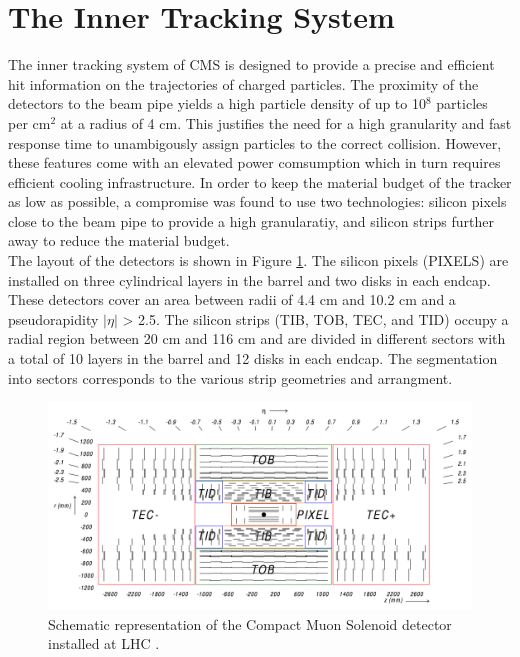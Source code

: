   \section{The Inner Tracking System}

    The inner tracking system of CMS is designed to provide a precise and efficient hit information on the trajectories of charged particles.  The proximity of the detectors to the beam pipe yields a high particle density of up to 10$^8$ particles per cm$^2$ at a radius of 4 cm. This justifies the need for a high granularity and fast response time to unambigously assign particles to the correct collision. However, these features come with an elevated power comsumption which in turn requires efficient cooling infrastructure. In order to keep the material budget of the tracker as low as possible, a compromise was found to use two technologies: silicon pixels close to the beam pipe to provide a high granularatiy, and silicon strips further away to reduce the material budget. \\

    The layout of the detectors is shown in Figure \ref{fig:I-3-tracker}. The silicon pixels (PIXELS) are installed on three cylindrical layers in the barrel and two disks in each endcap. These detectors cover an area between radii of 4.4 cm and 10.2 cm and a pseudorapidity $|\eta|$ > 2.5. The silicon strips (TIB, TOB, TEC, and TID) occupy a radial region between 20 cm and 116 cm and are divided in different sectors with a total of 10 layers in the barrel and 12 disks in each endcap. The segmentation into sectors corresponds to the various strip geometries and arrangment. \\

    \begin{figure}[h!]
      \centering
      \includegraphics[width=\textwidth]{img/I-3-cms/tracker.png}
      \caption{Schematic representation of the Compact Muon Solenoid detector installed at LHC \cite{1748-0221-3-08-S08004}.}
      \label{fig:I-3-tracker}
    \end{figure}

